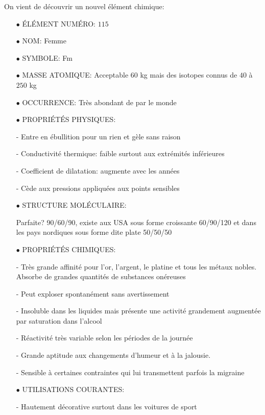 On vient de découvrir un nouvel élément chimique:

\begin{itemize}
	\item[$\bullet$] ÉLÉMENT NUMÉRO: $115$

	\item[$\bullet$] NOM: Femme

	\item[$\bullet$] SYMBOLE: Fm

	\item[$\bullet$] MASSE ATOMIQUE: Acceptable 60 kg mais des isotopes connus de $40$ à $250$ kg

	\item[$\bullet$] OCCURRENCE: Très abondant de par le monde

	\item[$\bullet$] PROPRIÉTÉS PHYSIQUES:

- Entre en ébullition pour un rien et gèle sans raison

- Conductivité thermique: faible surtout aux extrémités inférieures

- Coefficient de dilatation: augmente avec les années

- Cède aux pressions appliquées aux points sensibles

	\item[$\bullet$] STRUCTURE MOLÉCULAIRE:

Parfaite? 90/60/90, existe aux USA sous forme croissante 60/90/120 et dans les pays nordiques sous forme dite plate 50/50/50

	\item[$\bullet$] PROPRIÉTÉS CHIMIQUES:

- Très grande affinité pour l'or, l'argent, le platine et tous les métaux nobles. Absorbe de grandes quantités de substances onéreuses

- Peut exploser spontanément sans avertissement

- Insoluble dans les liquides mais présente une activité grandement augmentée par saturation dans l'alcool

- Réactivité très variable selon les périodes de la journée

- Grande aptitude aux changements d'humeur et à la jalousie.

- Sensible à certaines contraintes qui lui transmettent parfois la migraine

	\item[$\bullet$] UTILISATIONS COURANTES:

- Hautement décorative surtout dans les voitures de sport


\end{itemize}
